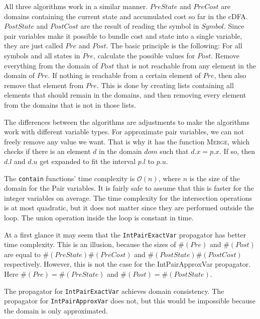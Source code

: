 \documentclass[a4paper,11pt]{article}
\begin{document}
All three algorithms work in a similar manner. $\mathit{PreState}$ and $\mathit{PreCost}$ are domains containing the current state and accumulated cost so far in the cDFA. $\mathit{PostState}$ and $\mathit{PostCost}$ are the result of reading the symbol in $\mathit{Symbol}$. Since pair variables make it possible to bundle cost and state into a single variable, they are just called $\mathit{Pre}$ and $\mathit{Post}$. The basic principle is the following: For all symbols and all states in $\mathit{Pre}$, calculate the possible values for $\mathit{Post}$. Remove everything from the domain of $\mathit{Post}$ that is not reachable from any element in the domain of $\mathit{Pre}$. If nothing is reachable from a certain element of $\mathit{Pre}$, then also remove that element from $\mathit{Pre}$. This is done by creating lists containing all elements that should remain in the domains, and then removing every element from the domains that is not in those lists.



The differences between the algorithms are adjustments to make the algorithms work with different variable types. For approximate pair variables, we can not freely remove any value we want. That is why it has the function \textsc{Merge}, which checks if there is an element $d$ in the domain $\mathit{dom}$ such that $d.x=p.x$. If so, then $d.l$ and $d.u$ get expanded to fit the interval $p.l$ to $p.u$. 

The \texttt{contain} functions' time complexity is $\mathcal{O}(n)$, where $n$ is the size of the domain for the Pair variables. It is fairly safe to assume that this is faster for the integer variables on average. The time complexity for the intersection operations is at most quadratic, but it does not matter since they are performed outside the loop. The union operation inside the loop is constant in time.

At a first glance it may seem that the \texttt{IntPairExactVar} propagator has better time complexity. This is an illusion, because the sizes of $\#(\mathit{Pre})$ and $\#(\mathit{Post})$ are equal to \linebreak
$\#(\mathit{PreState}) 
\#(\mathit{PreCost})$ and 
$\#(\mathit{PostState})\#({PostCost})$ respectively. However, this is not the case for the IntPairApproxVar propagator. Here $\#(\mathit{Pre})=\#(\mathit{PreState})$ and $\#(\mathit{Post})=\#(\mathit{PostState})$. 

The propagator for \texttt{IntPairExactVar} achieves domain consistency. The propagator for \texttt{IntPairApproxVar} does not, but this would be impossible because the domain is only approximated.
\end{document}
